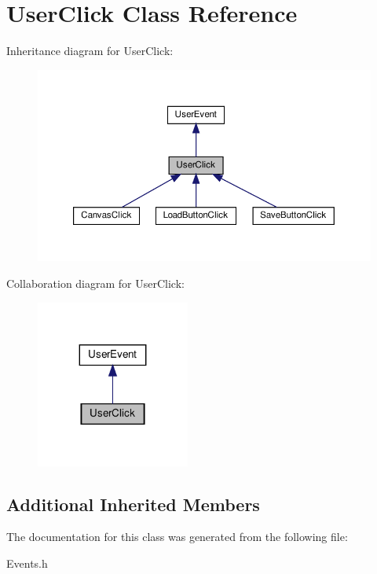 \hypertarget{classUserClick}{}\section{User\+Click Class Reference}
\label{classUserClick}


Inheritance diagram for User\+Click\+:\nopagebreak
\begin{figure}[H]
\begin{center}
\leavevmode
\includegraphics[width=350pt]{classUserClick__inherit__graph}
\end{center}
\end{figure}


Collaboration diagram for User\+Click\+:\nopagebreak
\begin{figure}[H]
\begin{center}
\leavevmode
\includegraphics[width=143pt]{classUserClick__coll__graph}
\end{center}
\end{figure}
\subsection*{Additional Inherited Members}


The documentation for this class was generated from the following file\+:\begin{DoxyCompactItemize}
\item 
Events.\+h\end{DoxyCompactItemize}
